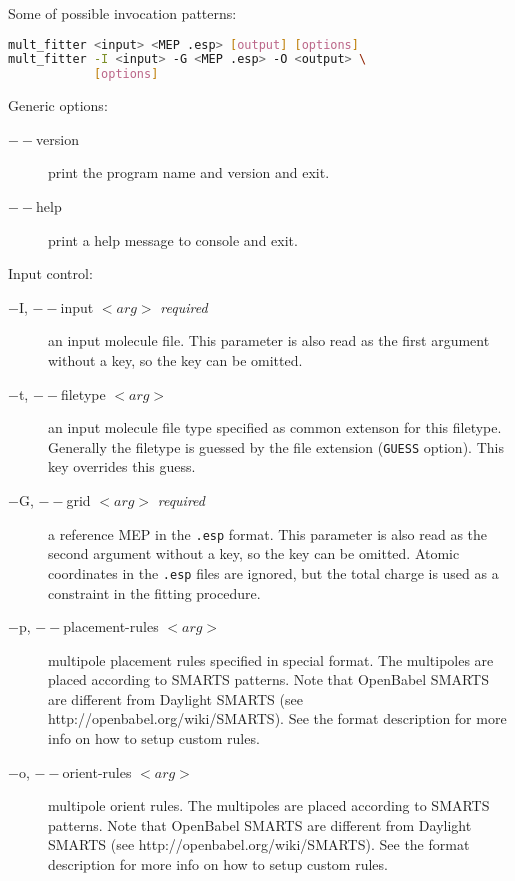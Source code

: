 \documentclass[10pt,a4paper]{article}
\begin{document}
Some of possible invocation patterns:
\begin{lstlisting}[language=bash]
mult_fitter <input> <MEP .esp> [output] [options]
mult_fitter -I <input> -G <MEP .esp> -O <output> \
            [options]
\end{lstlisting}

Generic options:
\begin{description}
\item[$--$version] print the program name and version and exit.
\item[$--$help] print a help message to console and exit.
\end{description}

Input control:
\begin{description}
\item[$-$I, $--$input $<arg>$ \textit{required}] an input molecule file. This parameter is
also read as the first argument without a key, so the key can be omitted.
\item[$-$t, $--$filetype $<arg>$] an input molecule file type specified as common extenson
for this filetype. Generally the filetype is guessed by the file extension 
(\lstinline{GUESS} option). This key overrides this guess.
\item[$-$G, $--$grid $<arg>$ \textit{required}] a reference MEP in the \lstinline{.esp} 
format. 
This parameter is also read as the second argument without a key, so the key can be 
omitted. Atomic coordinates in the \lstinline{.esp} files are ignored, but the total charge 
is used as a constraint in the fitting procedure. 
\item[$-$p, $--$placement-rules $<arg>$] multipole placement rules specified 
in special format.
The multipoles are placed according to SMARTS patterns. Note that OpenBabel SMARTS are
different from Daylight SMARTS (see http://openbabel.org/wiki/SMARTS). See the format
description for more info on how to setup custom rules.
\item[$-$o, $--$orient-rules $<arg>$] multipole orient rules. The multipoles are placed
according to SMARTS patterns. Note that OpenBabel SMARTS are 
different from Daylight SMARTS (see http://openbabel.org/wiki/SMARTS). See the format
description for more info on how to setup custom rules.
\end{description}
\end{document}
